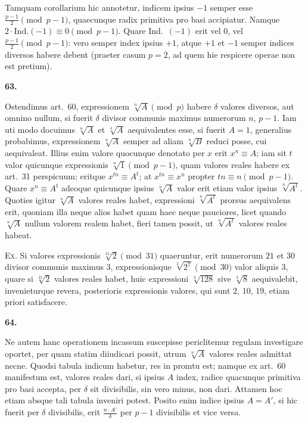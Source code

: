 \documentclass[12pt,a4paper]{article}
\theoremstyle{plain}
\theoremstyle{definition}
\theoremstyle{remark}
\begin{document}
Tamquam corollarium hic annotetur, indicem ipsius $-1$ semper esse $\frac{p-1}{2} \pmod{p-1}$, quaecunque radix primitiva pro basi accipiatur. Namque $2 \cdot \text{Ind.}(-1) \equiv 0 \pmod{p-1}$. Quare Ind.~$(-1)$ erit vel $0$, vel $\frac{p-1}{2} \pmod{p-1}$: vero semper index ipsius $+1$, atque $+1$ et $-1$ semper indices diversos habere debent (praeter casum $p=2$, ad quem hie respicere operae non est pretium).

\setcounter{satz}{63}
\addtocounter{satz}{-1}
\textbf{63.}

Ostendimus art.~60, expressionem $\sqrt[n]{A} \pmod{p}$ habere $\delta$ valores diversos, aut omnino nullum, si fuerit $\delta$ divisor communis maximus numerorum $n$, $p-1$. Iam uti modo docuimus $\sqrt[n]{A}$ et $\sqrt[\delta]{A}$ aequivalentes esse, si fuerit $A=1$, generalius probabimus, expressionem $\sqrt[n]{A}$ semper ad aliam $\sqrt[n]{B}$ reduci posse, cui aequivaleat. Illius enim valore quocunque denotato per $x$ erit $x^n \equiv A$; iam sit $t$ valor quicunque expressionis $\sqrt[n]{1} \pmod{p-1}$, quam valores reales habere ex art.~31 perspicuum; eritque $x^{tn} \equiv A^t$; at $x^{tn} \equiv x^n$ propter $tn \equiv n \pmod{p-1}$. Quare $x^n \equiv A^t$ adeoque quicunque ipsius $\sqrt[n]{A}$ valor erit etiam valor ipsius $\sqrt[n]{A^t}$. Quoties igitur $\sqrt[n]{A}$ valores reales habet, expressioni $\sqrt[n]{A^t}$ prorsus aequivalens erit, quoniam illa neque alios habet quam haec neque pauciores, licet quando $\sqrt[n]{A}$ nullum valorem realem habet, fieri tamen possit, ut $\sqrt[n]{A^t}$ valores reales habeat.

\textsc{Ex.} Si valores expressionis $\sqrt[21]{2} \pmod{31}$ quaeruntur, erit numerorum $21$ et $30$ divisor communis maximus $3$, expressionisque $\sqrt[3]{2^7} \pmod{30}$ valor aliquis $3$, quare si $\sqrt[21]{2}$ valores reales habet, huic expressioni $\sqrt[3]{128}$ sive $\sqrt[3]{8}$ aequivalebit, invenieturque revera, posterioris expressionis valores, qui sunt $2$, $10$, $19$, etiam priori satisfacere.

\setcounter{satz}{64}
\addtocounter{satz}{-1}
\textbf{64.}

Ne autem hanc operationem incassum suscepisse periclitemur regulam investigare oportet, per quam statim diiudicari possit, utrum $\sqrt[n]{A}$ valores reales admittat necne. Quodsi tabula indicum habetur, res in promtu est; namque ex art.~60 manifestum est, valores reales dari, si ipsius $A$ index, radice quacunque primitiva pro basi accepta, per $\delta$ sit divisibilis, sin vero minus, non dari. Attamen hoc etiam absque tali tabula inveniri potest. Posito enim indice ipsius $A = A'$, si hic fuerit per $\delta$ divisibilis, erit $\frac{n \cdot A'}{\delta}$ per $p-1$ divisibilis et vice versa.
\end{document}
